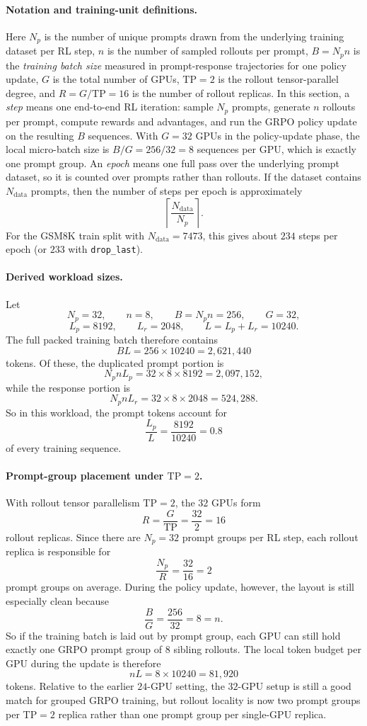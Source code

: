 \documentclass[11pt]{article}
\begin{document}
\paragraph{Notation and training-unit definitions.}
Here $N_p$ is the number of unique prompts drawn from the underlying training
dataset per RL step, $n$ is the number of sampled rollouts per prompt,
$B = N_p n$ is the \emph{training batch size} measured in prompt-response
trajectories for one policy update, $G$ is the total number of GPUs,
$\mathrm{TP}=2$ is the rollout tensor-parallel degree, and
$R = G / \mathrm{TP} = 16$ is the number of rollout replicas. In this
section, a \emph{step} means one end-to-end RL iteration: sample $N_p$ prompts,
generate $n$ rollouts per prompt, compute rewards and advantages, and run the
GRPO policy update on the resulting $B$ sequences. With $G=32$ GPUs in the
policy-update phase, the local micro-batch size is $B/G = 256/32 = 8$
sequences per GPU, which is exactly one prompt group. An \emph{epoch} means one
full pass over the underlying prompt dataset, so it is counted over prompts
rather than rollouts. If the dataset contains $N_{\mathrm{data}}$ prompts, then
the number of steps per epoch is approximately
\[
\left\lceil \frac{N_{\mathrm{data}}}{N_p} \right\rceil.
\]
For the GSM8K train split with $N_{\mathrm{data}} = 7473$, this gives about
$234$ steps per epoch (or $233$ with \texttt{drop\_last}).

\paragraph{Derived workload sizes.}
Let
\[
N_p = 32, \qquad n = 8, \qquad B = N_p n = 256, \qquad G = 32,
\]
\[
L_p = 8192, \qquad L_r = 2048, \qquad L = L_p + L_r = 10240.
\]
The full packed training batch therefore contains
\[
B L = 256 \times 10240 = 2{,}621{,}440
\]
tokens. Of these, the duplicated prompt portion is
\[
N_p n L_p = 32 \times 8 \times 8192 = 2{,}097{,}152,
\]
while the response portion is
\[
N_p n L_r = 32 \times 8 \times 2048 = 524{,}288.
\]
So in this workload, the prompt tokens account for
\[
\frac{L_p}{L} = \frac{8192}{10240} = 0.8
\]
of every training sequence.

\paragraph{Prompt-group placement under $\mathrm{TP}=2$.}
With rollout tensor parallelism $\mathrm{TP}=2$, the $32$ GPUs form
\[
R = \frac{G}{\mathrm{TP}} = \frac{32}{2} = 16
\]
rollout replicas. Since there are $N_p = 32$ prompt groups per RL step, each
rollout replica is responsible for
\[
\frac{N_p}{R} = \frac{32}{16} = 2
\]
prompt groups on average. During the policy update, however, the layout is still
especially clean because
\[
\frac{B}{G} = \frac{256}{32} = 8 = n.
\]
So if the training batch is laid out by prompt group, each GPU can still hold
exactly one GRPO prompt group of $8$ sibling rollouts. The local token budget
per GPU during the update is therefore
\[
nL = 8 \times 10240 = 81{,}920
\]
tokens. Relative to the earlier $24$-GPU setting, the $32$-GPU setup is still a
good match for grouped GRPO training, but rollout locality is now two prompt
groups per TP$=2$ replica rather than one prompt group per single-GPU replica.
\end{document}
